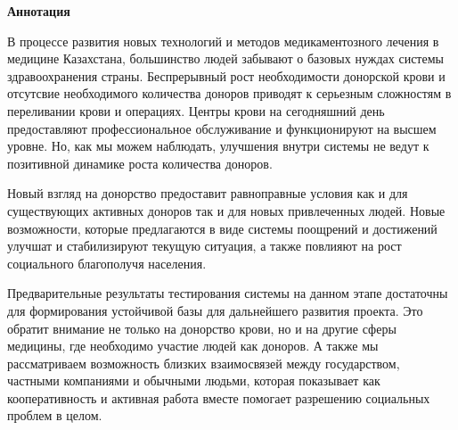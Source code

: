 \newpage
\pagestyle{plain}

{
\begin{center}
    \Large
    \textbf{Аннотация}
\end{center}
\par
В процессе развития новых технологий и методов медикаментозного лечения в медицине Казахстана, большинство людей забывают о базовых нуждах системы здравоохранения страны. Беспрерывный рост необходимости донорской крови и отсутсвие необходимого количества доноров приводят к серьезным сложностям в переливании крови и операциях. Центры крови на сегодняшний день предоставляют профессиональное обслуживание и функционируют на высшем уровне. Но, как мы можем наблюдать, улучшения внутри системы не ведут к позитивной динамике роста количества доноров.
\par
Новый взгляд на донорство предоставит равноправные условия как и для существующих активных доноров так и для новых привлеченных людей. Новые возможности, которые предлагаются в виде системы поощрений и достижений улучшат и стабилизируют текущую ситуация, а также повлияют на рост социального благополучя населения.
\par
Предварительные результаты тестирования системы на данном этапе достаточны для формирования устойчивой базы для дальнейшего развития проекта. Это обратит внимание не только на донорство крови, но и на другие сферы медицины, где необходимо участие людей как доноров. А также мы рассматриваем возможность близких взаимосвязей между государством, частными компаниями и обычными людьми, которая показывает как кооперативность и активная работа вместе помогает разрешению социальных проблем в целом.
}